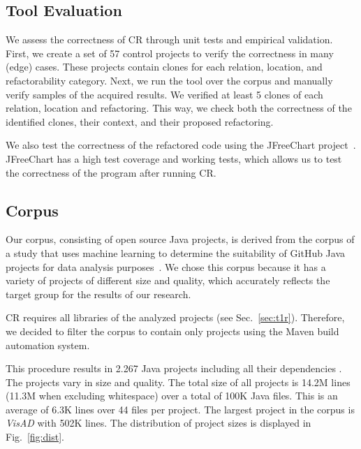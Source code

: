 \documentclass[a4paper,UKenglish,cleveref, autoref, thm-restate,authorcolumns]{lipics-v2019}
\begin{document}
\subsection{Tool Evaluation}
We assess the correctness of CR through unit tests and empirical validation. First, we create a set of 57 control projects to verify the correctness in many (edge) cases. These projects contain clones for each relation, location, and refactorability category. 
Next, we run the tool over the corpus and manually verify samples of the acquired results. We verified at least 5 clones of each relation, location and refactoring. This way, we check both the correctness of the identified clones, their context, and their proposed refactoring.

We also test the correctness of the refactored code using the JFreeChart project~\cite{gilbert2002jfreechart}. JFreeChart has a high test coverage and working tests, which allows us to test the correctness of the program after running CR.

\subsection{Corpus}
Our corpus, consisting of open source Java projects, is derived from the corpus of a study that uses machine learning to determine the suitability of GitHub Java projects for data analysis purposes~\cite{githubCorpus2013}. We chose this corpus because it has a variety of projects of different size and quality, which accurately reflects the target group for the results of our research.

CR requires all libraries of the analyzed projects
(see Sec.~\ref{sec:t1r}). Therefore, we decided to filter the corpus to contain only projects using the Maven build automation system. %

This procedure results in 2.267 Java projects including all their dependencies%
. The projects vary in size and quality. The total size of all projects is 14.2M lines (11.3M when excluding whitespace) over a total of 100K Java files. This is an average of 6.3K lines over 44 files per project. The largest project in the corpus is \textit{VisAD} with 502K lines. The distribution of project sizes is displayed in Fig.~\ref{fig:dist}.
\end{document}
